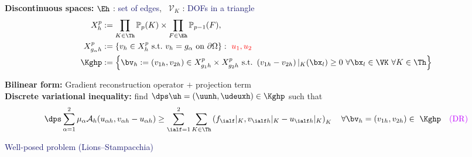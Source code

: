 \begin{frame}
  \textcolor{cadmiumgreen}{\textbf{Discontinuous spaces:}} \hspace{4 cm} 
  $\Eh$ : \textcolor{midnightblue}{set of edges}, \ $\mathcal{V}_K$ : \textcolor{midnightblue}{DOFs in a triangle}
    \begin{equation*}
    \begin{split}
      X_h^p &:= \prod_{K \in \Th} \mathbb{P}_p(K) \times \prod_{F \in \Eh} \mathbb{P}_{p-1}(F), \quad \\
      X_{g_{\alpha} h}^p &:= \left\{ v_h \in  X_h^p \ \text{s.t.} \ v_h=g_{\alpha} \ \text{on} \ \partial \Omega \right\}: \ \textcolor{red}{u_1, u_2} 
      \\
       \Kghp & := \left\{ \bv_h := \left(v_{1h},v_{2h}  \right) \in X_{g_1 h}^p \times X_{g_2 h}^p \ \text{s.t.} \ \left(v_{1h} - v_{2h}\right)|_{K}(\bx_l) \geq 0 \ \forall \bx_l \in \VK \ \forall K \in \Th \right\}
    \end{split}
    \end{equation*}

\textcolor{cadmiumgreen}{\textbf{Bilinear form:}} 
Gradient reconstruction operator $+$ projection term 
\\
 \textcolor{cadmiumgreen}{\textbf{Discrete variational inequality:}} find $\dps \uh=(\uunh,\udeuxh) \in \Kghp$ such that
\begin{equation*}
\dps \sum_{\alpha=1}^2 \mu_{\alpha} \mathcal{A}_h(u_{\alpha h}, v_{\alpha h} - u_{\alpha h}) \geq \sum_{\ialf=1}^2 \sum_{K \in \Th} \left(f_\ialf|_K,v_{\ialf h}|_K-u_{\ialf h}|_K\right)_{K} \quad \forall \bv_h = (v_{1h},v_{2h})\in ~\Kghp \quad \textcolor{electricpurple}{(\mathrm{DR})}
\end{equation*}
 \begin{center}
\textcolor{midnightblue}{Well-posed problem (Lions--Stampacchia)}
\end{center}
\end{frame}
